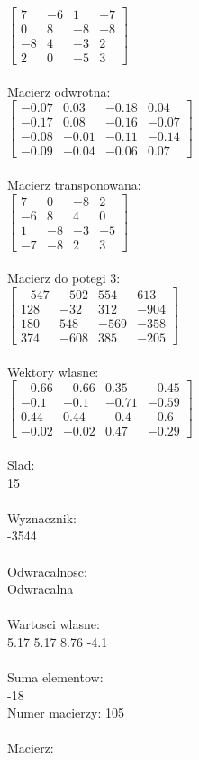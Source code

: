 \documentclass[a4paper,12pt]{article}
\begin{document}
$\begin{bmatrix} 7&-6&1&-7\\0&8&-8&-8\\-8&4&-3&2\\2&0&-5&3 \end{bmatrix}$
\\
\\
Macierz odwrotna:\\

$\begin{bmatrix} -0.07&0.03&-0.18&0.04\\-0.17&0.08&-0.16&-0.07\\-0.08&-0.01&-0.11&-0.14\\-0.09&-0.04&-0.06&0.07 \end{bmatrix}$
\\
\\
Macierz transponowana:\\

$\begin{bmatrix} 7&0&-8&2\\-6&8&4&0\\1&-8&-3&-5\\-7&-8&2&3 \end{bmatrix}$
\\
\\
Macierz do potegi 3:\\

$\begin{bmatrix} -547&-502&554&613\\128&-32&312&-904\\180&548&-569&-358\\374&-608&385&-205 \end{bmatrix}$
\\
\\
Wektory wlasne:\\

$\begin{bmatrix} -0.66&-0.66&0.35&-0.45\\-0.1&-0.1&-0.71&-0.59\\0.44&0.44&-0.4&-0.6\\-0.02&-0.02&0.47&-0.29 \end{bmatrix}$
\\
\\
Slad:\\
15
\\
\\
Wyznacznik:\\
-3544
\\
\\
Odwracalnosc:\\
Odwracalna
\\
\\
Wartosci wlasne:\\
5.17 5.17 8.76 -4.1
\\
\\
Suma elementow:\\
-18
\\
\newpage
Numer macierzy:
105
\\
\\
Macierz:\\
\end{document}
